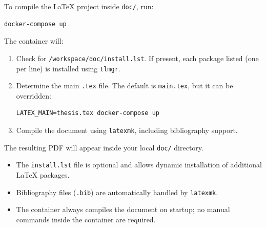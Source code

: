 \documentclass[11pt,a4paper]{article}
\begin{document}
To compile the LaTeX project inside \texttt{doc/}, run:

\begin{verbatim}
docker-compose up
\end{verbatim}

The container will:

\begin{enumerate}
    \item Check for \texttt{/workspace/doc/install.lst}.  
          If present, each package listed (one per line) is installed using \texttt{tlmgr}.
    \item Determine the main \texttt{.tex} file.  
          The default is \texttt{main.tex}, but it can be overridden:
\begin{verbatim}
LATEX_MAIN=thesis.tex docker-compose up
\end{verbatim}
    \item Compile the document using \texttt{latexmk}, including bibliography support.
\end{enumerate}

The resulting PDF will appear inside your local \texttt{doc/} directory.

\begin{itemize}
    \item The \texttt{install.lst} file is optional and allows dynamic installation of additional LaTeX packages.
    \item Bibliography files (\texttt{.bib}) are automatically handled by \texttt{latexmk}.
    \item The container always compiles the document on startup; no manual commands inside the container are required.
\end{itemize}
\end{document}
